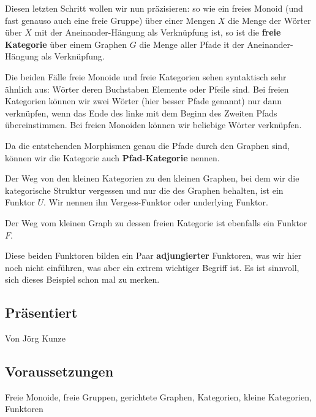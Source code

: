 \documentclass[a4paper]{amsart}
\theoremstyle{definition}
\begin{document}
Diesen letzten Schritt wollen wir nun präzisieren: so wie ein freies Monoid (und fast genauso auch eine freie Gruppe) über einer Mengen $X$ die Menge der Wörter über $X$ mit der Aneinander-Hängung als Verknüpfung ist, so ist die \textbf{freie Kategorie} über einem Graphen $G$ die Menge aller Pfade it der Aneinander-Hängung als Verknüpfung.

Die beiden Fälle freie Monoide und freie Kategorien sehen syntaktisch sehr ähnlich aus: Wörter deren Buchstaben Elemente oder Pfeile sind. Bei freien Kategorien können wir zwei Wörter (hier besser Pfade genannt) nur dann verknüpfen, wenn das Ende des linke mit dem Beginn des Zweiten Pfads übereinstimmen. Bei freien Monoiden können wir beliebige Wörter verknüpfen.

Da die entstehenden Morphismen genau die Pfade durch den Graphen sind, können wir die Kategorie auch \textbf{Pfad-Kategorie} nennen.

Der Weg von den kleinen Kategorien zu den kleinen Graphen, bei dem wir die kategorische Struktur vergessen und nur die des Graphen behalten, ist ein Funktor $U$. Wir nennen ihn Vergess-Funktor oder underlying Funktor.

Der Weg vom kleinen Graph zu dessen freien Kategorie ist ebenfalls ein Funktor $F$.

Diese beiden Funktoren bilden ein Paar \textbf{adjungierter} Funktoren, was wir hier noch nicht einführen, was aber ein extrem wichtiger Begriff ist. Es ist sinnvoll, sich dieses Beispiel schon mal zu merken.

\subsection*{Präsentiert}
Von Jörg Kunze

\subsection*{Voraussetzungen}
Freie Monoide, freie Gruppen, gerichtete Graphen, Kategorien, kleine Kategorien, Funktoren

\end{document}
